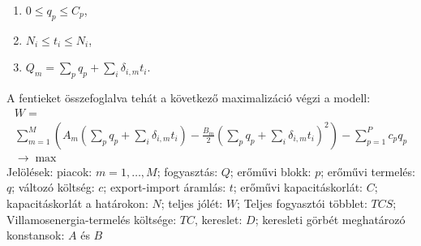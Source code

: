 \documentclass[twoside, magyar, showtrims]{corvinusphd}
\theoremstyle{plain}
\theoremstyle{remark}
\theoremstyle{definition}
\begin{document}
\begin{enumerate}
    \item $0\leq q_p\leq C_p$,
    \item $N_i\leq t_i\leq N_i$,
    \item $Q_m=\sum_{p}q_p+\sum_i\delta_{i,m}t_i.$
\end{enumerate}
A fentieket összefoglalva tehát a következő maximalizáció végzi a modell:
\begin{multline}
    W=\\
    \sum_{m=1}^M\left( A_m\left( \sum_pq_p+\sum_i\delta_{i,m}t_i \right)-\frac{B_m}{2}\left( \sum_pq_p+\sum_i\delta_{i,m}t_i \right)^2 \right)
    -
    \sum_{p=1}^Pc_pq_p\\
    \rightarrow \max
\end{multline}
Jelölések: piacok: $m=1,\ldots,M$; fogyasztás: $Q$; erőművi blokk: $p$;
erőművi termelés: $q$; változó költség: $c$; export-import áramlás: $t$;
erőművi kapacitáskorlát: $C$; kapacitáskorlát a határokon: $N$;
teljes jólét: $W$; Teljes fogyasztói többlet: $TCS$;
Villamosenergia-termelés költsége: $TC$, kereslet: $D$;
keresleti görbét meghatározó konstansok: $A$ és $B$
\end{document}
